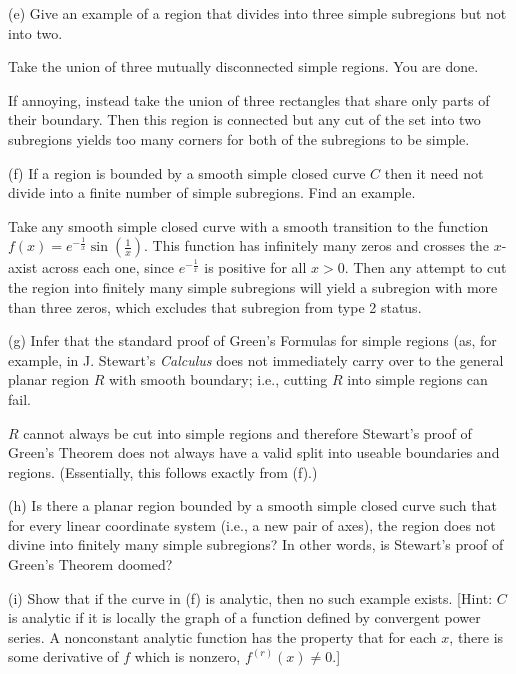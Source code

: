 \documentclass{amsart}
\begin{document}
(e) Give an example of a region that divides into three simple subregions but not into two.

\medskip \noindent Take the union of three mutually disconnected simple regions. You are done.

\medskip \noindent If annoying, instead take the union of three rectangles that share only parts of their
boundary. Then this region is connected but any cut of the set into two subregions yields too many corners for
both of the subregions to be simple.

\bigskip

(f) If a region is bounded by a smooth simple closed curve $C$ then it need not divide into a finite number of simple subregions. Find an example.

\medskip \noindent Take any smooth simple closed curve with a smooth transition to the function $f(x)=e^{-\frac{1}{x}}\sin(\frac{1}{x})$. This function
has infinitely many zeros and crosses the $x$-axist across each one, since $e^{-\frac{1}{x}}$ is positive for all $x>0$. Then any attempt
to cut the region into finitely many simple subregions will yield a subregion with more than three zeros, which excludes that subregion from type 2 status.


\bigskip

(g) Infer that the standard proof of Green's Formulas for simple regions (as, for example, in J. Stewart's \textit{Calculus} does not immediately carry over to the general planar region $R$ with smooth boundary; i.e., cutting $R$ into simple regions can fail.

\medskip \noindent $R$ cannot always be cut into simple regions and therefore Stewart's proof of
Green's Theorem does not always have a valid split into useable boundaries and regions. (Essentially,
this follows exactly from (f).)

\bigskip


(h) Is there a planar region bounded by a smooth simple closed curve such that for every linear coordinate system (i.e., a new pair of axes), the region does not divine into finitely many simple subregions? In other words, is Stewart's proof of Green's Theorem doomed?

(i) Show that if the curve in (f) is analytic, then no such example exists. [Hint: $C$ is analytic if it is locally the graph of a function defined by convergent power series. A nonconstant analytic function has the property that for each $x$, there is some derivative of $f$ which is nonzero, $f^{(r)}(x)\neq 0$.]
\end{document}
